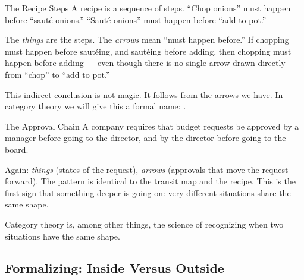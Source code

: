 \begin{example}{The Recipe Steps}
A recipe is a sequence of steps. ``Chop onions'' must happen before ``sauté
onions.'' ``Sauté onions'' must happen before ``add to pot.''

\medskip
\begin{center}
\end{center}
\medskip

The \emph{things} are the steps. The \emph{arrows} mean ``must happen before.''
If chopping must happen before sautéing, and sautéing before adding, then
chopping must happen before adding --- even though there is no single arrow
drawn directly from ``chop'' to ``add to pot.''

This indirect conclusion is not magic. It follows from the arrows we have.
In category theory we will give this a formal name: .
\end{example}

\begin{example}{The Approval Chain}
A company requires that budget requests be approved by a manager before going
to the director, and by the director before going to the board.

\medskip
\begin{center}
\end{center}
\medskip

Again: \emph{things} (states of the request), \emph{arrows} (approvals that
move the request forward). The pattern is identical to the transit map and the
recipe. This is the first sign that something deeper is going on: very
different situations share the same shape.

Category theory is, among other things, the science of recognizing when two
situations have the same shape.
\end{example}

\subsection{Formalizing: Inside Versus Outside}

